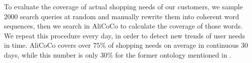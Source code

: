 To evaluate the coverage of actual shopping needs of our customers, we sample $2000$ search queries at random and manually rewrite them into coherent word sequences, then we search in AliCoCo to calculate the coverage of those words. 
We repeat this procedure every day, in order to detect new trends of user needs in time. 
AliCoCo covers over $75\%$ of shopping needs on average in continuous $30$ days, while this number is only $30\%$ for the former ontology mentioned in .






